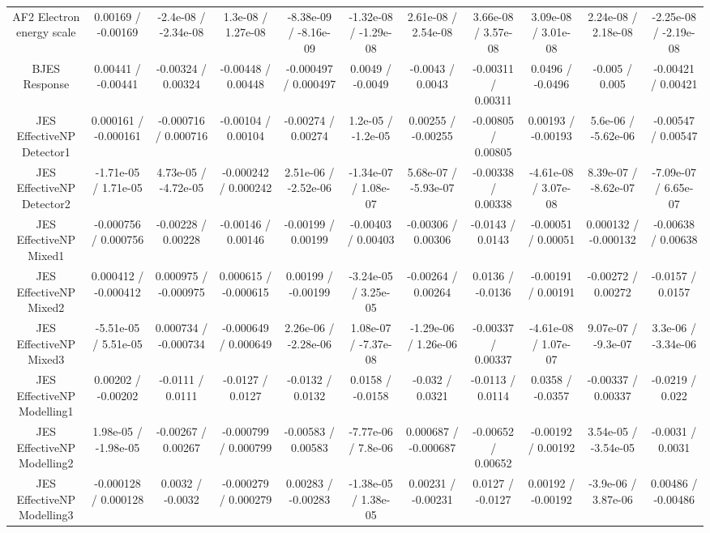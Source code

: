 \begin{table}[htbp]
\begin{center}
\begin{tabular}{|c|c|c|c|c|c|c|c|c|c|c|}
  AF2 Electron energy scale & 0.00169 / -0.00169 & -2.4e-08 / -2.34e-08 & 1.3e-08 / 1.27e-08 & -8.38e-09 / -8.16e-09 & -1.32e-08 / -1.29e-08 & 2.61e-08 / 2.54e-08 & 3.66e-08 / 3.57e-08 & 3.09e-08 / 3.01e-08 & 2.24e-08 / 2.18e-08 & -2.25e-08 / -2.19e-08 \\ 
  BJES Response & 0.00441 / -0.00441 & -0.00324 / 0.00324 & -0.00448 / 0.00448 & -0.000497 / 0.000497 & 0.0049 / -0.0049 & -0.0043 / 0.0043 & -0.00311 / 0.00311 & 0.0496 / -0.0496 & -0.005 / 0.005 & -0.00421 / 0.00421 \\ 
  JES EffectiveNP Detector1 & 0.000161 / -0.000161 & -0.000716 / 0.000716 & -0.00104 / 0.00104 & -0.00274 / 0.00274 & 1.2e-05 / -1.2e-05 & 0.00255 / -0.00255 & -0.00805 / 0.00805 & 0.00193 / -0.00193 & 5.6e-06 / -5.62e-06 & -0.00547 / 0.00547 \\ 
  JES EffectiveNP Detector2 & -1.71e-05 / 1.71e-05 & 4.73e-05 / -4.72e-05 & -0.000242 / 0.000242 & 2.51e-06 / -2.52e-06 & -1.34e-07 / 1.08e-07 & 5.68e-07 / -5.93e-07 & -0.00338 / 0.00338 & -4.61e-08 / 3.07e-08 & 8.39e-07 / -8.62e-07 & -7.09e-07 / 6.65e-07 \\ 
  JES EffectiveNP Mixed1 & -0.000756 / 0.000756 & -0.00228 / 0.00228 & -0.00146 / 0.00146 & -0.00199 / 0.00199 & -0.00403 / 0.00403 & -0.00306 / 0.00306 & -0.0143 / 0.0143 & -0.00051 / 0.00051 & 0.000132 / -0.000132 & -0.00638 / 0.00638 \\ 
  JES EffectiveNP Mixed2 & 0.000412 / -0.000412 & 0.000975 / -0.000975 & 0.000615 / -0.000615 & 0.00199 / -0.00199 & -3.24e-05 / 3.25e-05 & -0.00264 / 0.00264 & 0.0136 / -0.0136 & -0.00191 / 0.00191 & -0.00272 / 0.00272 & -0.0157 / 0.0157 \\ 
  JES EffectiveNP Mixed3 & -5.51e-05 / 5.51e-05 & 0.000734 / -0.000734 & -0.000649 / 0.000649 & 2.26e-06 / -2.28e-06 & 1.08e-07 / -7.37e-08 & -1.29e-06 / 1.26e-06 & -0.00337 / 0.00337 & -4.61e-08 / 1.07e-07 & 9.07e-07 / -9.3e-07 & 3.3e-06 / -3.34e-06 \\ 
  JES EffectiveNP Modelling1 & 0.00202 / -0.00202 & -0.0111 / 0.0111 & -0.0127 / 0.0127 & -0.0132 / 0.0132 & 0.0158 / -0.0158 & -0.032 / 0.0321 & -0.0113 / 0.0114 & 0.0358 / -0.0357 & -0.00337 / 0.00337 & -0.0219 / 0.022 \\ 
  JES EffectiveNP Modelling2 & 1.98e-05 / -1.98e-05 & -0.00267 / 0.00267 & -0.000799 / 0.000799 & -0.00583 / 0.00583 & -7.77e-06 / 7.8e-06 & 0.000687 / -0.000687 & -0.00652 / 0.00652 & -0.00192 / 0.00192 & 3.54e-05 / -3.54e-05 & -0.0031 / 0.0031 \\ 
  JES EffectiveNP Modelling3 & -0.000128 / 0.000128 & 0.0032 / -0.0032 & -0.000279 / 0.000279 & 0.00283 / -0.00283 & -1.38e-05 / 1.38e-05 & 0.00231 / -0.00231 & 0.0127 / -0.0127 & 0.00192 / -0.00192 & -3.9e-06 / 3.87e-06 & 0.00486 / -0.00486 \\ 

\end{tabular}
\end{center}
\end{table}
